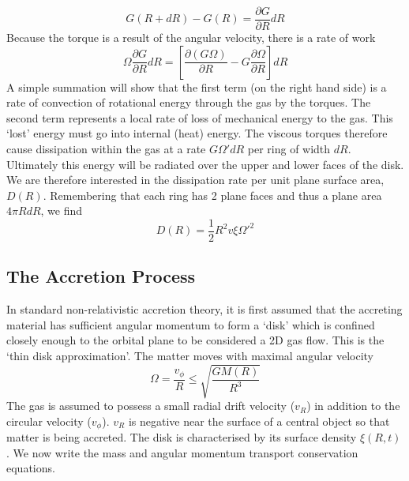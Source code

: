 \begin{equation}
	G(R + dR) - G(R) = \frac{\partial G}{\partial R} dR
	\label{eqn_nettorqueofgas}
\end{equation}
Because the torque is a result of the angular velocity, there is a rate of work
\begin{equation}
	\Omega \frac{\partial G}{\partial R} dR = \left[ \frac{\partial (G \Omega)}{\partial R} - G \frac{\partial \Omega}{\partial R}\right] dR
	\label{eqn_nettorqueofgaswork}
\end{equation}
A simple summation will show that the first term (on the right hand side) is a rate of convection of rotational energy through the gas by the
torques. The second term represents a local rate of loss of mechanical energy to the gas. This `lost' energy must go into internal (heat)
energy. The viscous torques therefore cause dissipation within the gas at a rate $G \Omega ' dR$ per ring of width $dR$. Ultimately this
energy will be radiated over the upper and lower faces of the disk. We are therefore interested in the dissipation rate per unit plane
surface area, $D(R)$. Remembering that each ring has 2 plane faces and thus a plane area $4 \pi R dR$, we find
\begin{equation}
	D(R) = \frac{1}{2} R^2 v \xi \Omega'^2
	\label{eqn_dissipationrate}
\end{equation}

\subsection{The Accretion Process}
In standard non-relativistic accretion theory, it is first assumed that the accreting material has sufficient angular momentum to form a `disk'
which is confined closely enough to the orbital plane to be considered a 2D gas flow. This is the `thin disk approximation'. The matter moves
with maximal angular velocity
\begin{equation}
	\Omega = \frac{v_\phi}{R} \leq \sqrt{\frac{GM(R)}{R^3}}
	\label{eqn_maximalangular}
\end{equation}
The gas is assumed to possess a small radial drift velocity ($v_R$) in addition to the circular velocity ($v_\phi$). $v_R$ is negative near
the surface of a central object so that matter is being accreted. The disk is characterised by its surface density $\xi(R,t)$. We now write
the mass and angular momentum transport conservation equations.

